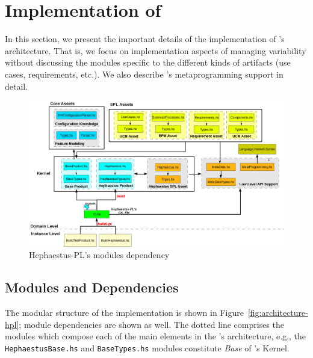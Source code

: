 \section{Implementation of \hpl}
\label{sec:implementation}

In this section, we present the important details of the implementation of \hpl's architecture. That is, we focus on implementation aspects of managing variability without discussing the modules specific to the different kinds of artifacts (use cases, requirements, etc.). We also describe \hpl's metaprogramming support in detail.


\begin{figure}[bth]
\begin{center}
\includegraphics[scale=0.35]{imagens/modules-hpl.png}
\end{center}
\caption{Hephaestus-PL's modules dependency}
\label{fig:modules-hpl}
\end{figure}


\subsection{Modules and Dependencies}

The modular structure of the implementation is shown in Figure~\ref{fig:architecture-hpl}; module dependencies are shown as well. The dotted line comprises the modules which compose each of the main elements in the \hpl's architecture, e.g., the \texttt{HephaestusBase.hs} and \texttt{BaseTypes.hs} modules constitute \hp{} \emph{Base} of \hpl's Kernel.

